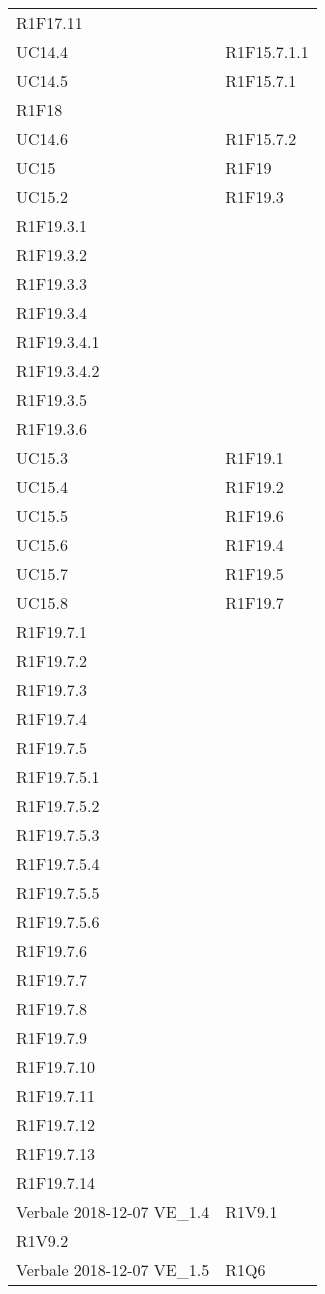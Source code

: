 \begin{center}
\begin{longtable}{ >{\centering}p{}
			>{\centering}p{}}
		R1F17.11	\tabularnewline
		UC14.4	&	R1F15.7.1.1	\tabularnewline
		UC14.5	&	R1F15.7.1\\
		R1F18	\tabularnewline
		UC14.6	&	R1F15.7.2	\tabularnewline
		UC15	&	R1F19	\tabularnewline
		UC15.2	&	R1F19.3\\
		R1F19.3.1\\
		R1F19.3.2\\
		R1F19.3.3\\
		R1F19.3.4\\
		R1F19.3.4.1\\
		R1F19.3.4.2\\
		R1F19.3.5\\
		R1F19.3.6	\tabularnewline
		UC15.3	&	R1F19.1	\tabularnewline
		UC15.4	&	R1F19.2	\tabularnewline
		UC15.5	&	R1F19.6	\tabularnewline
		UC15.6	&	R1F19.4	\tabularnewline
		UC15.7	&	R1F19.5	\tabularnewline
		UC15.8	&	R1F19.7\\
		R1F19.7.1\\
		R1F19.7.2\\
		R1F19.7.3\\
		R1F19.7.4\\
		R1F19.7.5\\
		R1F19.7.5.1\\
		R1F19.7.5.2\\
		R1F19.7.5.3\\
		R1F19.7.5.4\\
		R1F19.7.5.5\\
		R1F19.7.5.6\\
		R1F19.7.6\\
		R1F19.7.7\\
		R1F19.7.8\\
		R1F19.7.9\\
		R1F19.7.10\\
		R1F19.7.11\\
		R1F19.7.12\\
		R1F19.7.13\\
		R1F19.7.14	\tabularnewline
		Verbale 2018-12-07 VE\_1.4	&	R1V9.1\\
		R1V9.2	\tabularnewline
		Verbale 2018-12-07 VE\_1.5	&	R1Q6	\tabularnewline
		
		
	\end{longtable}
\end{center}